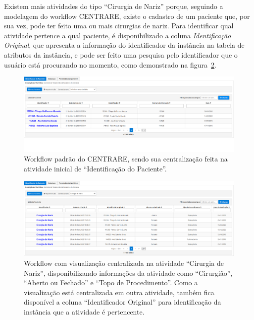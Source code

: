 Existem mais atividades do tipo ``Cirurgia de Nariz'' porque, seguindo a modelagem do workflow CENTRARE, existe o cadastro de um paciente que, por sua vez, pode ter feito uma ou mais cirurgias de nariz. Para identificar qual atividade pertence a qual paciente, é disponibilizado a coluna \textit{Identificação Original}, que apresenta a informação do identificador da instância na tabela de atributos da instância, e pode ser feito uma pesquisa pelo identificador que o usuário está procurando no momento, como demonstrado na figura~\ref{fig:changedInstance}.


\begin{figure}
    \centering
    \includegraphics[width=1\textwidth]{imgs/CENTRARE/instanciaNormal.png}
    \caption{Workflow padrão do CENTRARE, sendo sua centralização feita na atividade inicial de ``Identificação do Paciente''.}
    \label{fig:normalInstance}
\end{figure}

\begin{figure}
    \centering
    \includegraphics[width=1\textwidth]{imgs/CENTRARE/instanciaAlterada.png}
    \caption{Workflow com visualização centralizada na atividade ``Cirurgia de Nariz'', disponibilizando informações da atividade como ``Cirurgião'', ``Aberto ou Fechado'' e ``Topo de Procedimento''. Como a visualização está centralizada em outra atividade, também fica disponível a coluna ``Identificador Original'' para identificação da instância que a atividade é pertencente.}
    \label{fig:changedInstance}
\end{figure}

